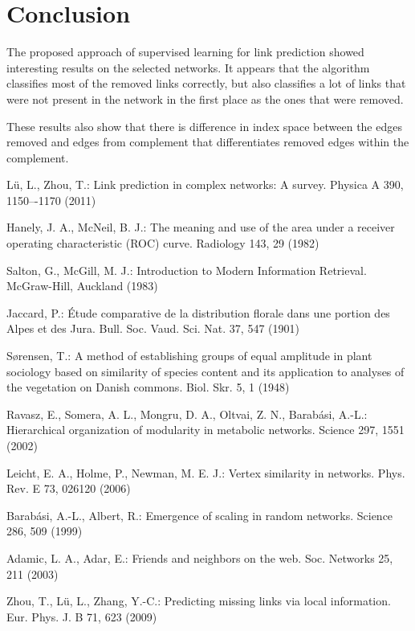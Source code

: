 \documentclass{llncs}
\begin{document}
\section{Conclusion}
%
The proposed approach of supervised learning for link prediction showed interesting results on the selected networks. It appears that the algorithm classifies most of the removed links correctly, but also classifies a lot of links that were not present in the network in the first place as the ones that were removed.

These results also show that there is difference in index space between the edges removed and edges from complement that differentiates removed edges within the complement.
%
%
%
\begin{thebibliography}{28}

L{\"u}, L., Zhou, T.:
Link prediction in complex networks: A survey.
Physica A 390, 1150–-1170 (2011)

Hanely, J. A., McNeil, B. J.:
The meaning and use of the area under a receiver operating characteristic (ROC) curve.
Radiology 143, 29 (1982)

Salton, G., McGill, M. J.:
Introduction to Modern Information Retrieval.
McGraw-Hill, Auckland (1983)

Jaccard, P.:
{\'E}tude comparative de la distribution florale dans une portion des Alpes et des Jura.
Bull. Soc. Vaud. Sci. Nat. 37, 547 (1901)

S{\o}rensen, T.: 
A method of establishing groups of equal amplitude in plant sociology based on similarity of species content and its application to analyses of the vegetation on Danish commons.
Biol. Skr. 5, 1 (1948)

Ravasz, E., Somera, A. L., Mongru, D. A., Oltvai, Z. N., Barab{\'a}si, A.-L.:
Hierarchical organization of modularity in metabolic networks. 
Science 297, 1551 (2002)

Leicht, E. A., Holme, P., Newman, M. E. J.:
Vertex similarity in networks.
Phys. Rev. E 73, 026120 (2006)

Barab{\'a}si, A.-L., Albert, R.:
Emergence of scaling in random networks.
Science 286, 509 (1999)

Adamic, L. A., Adar, E.:
Friends and neighbors on the web.
Soc. Networks 25, 211 (2003)

Zhou, T., L{\"u}, L., Zhang, Y.-C.:
Predicting missing links via local information.
Eur. Phys. J. B 71, 623 (2009)


\end{thebibliography}
\end{document}
